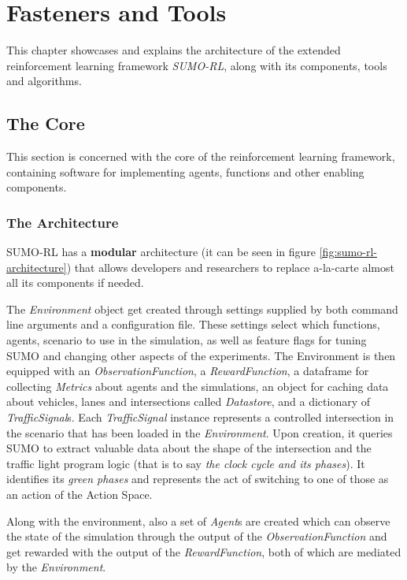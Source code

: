 \chapter{Fasteners and Tools}

This chapter showcases and explains the architecture of the extended reinforcement learning framework \textit{SUMO-RL}, along with its components, tools and algorithms.

\section{The Core}

This section is concerned with the core of the reinforcement learning framework, containing software for implementing agents, functions and other enabling components.

\subsection{The Architecture}

SUMO-RL has a \textbf{modular} architecture (it can be seen in figure \ref{fig:sumo-rl-architecture}) that allows developers and researchers to replace a-la-carte almost all its components if needed.

The \textit{Environment} object get created through settings supplied by both command line arguments and a configuration file.
These settings select which functions, agents, scenario to use in the simulation, as well as feature flags for tuning SUMO and changing other aspects of the experiments.
The Environment is then equipped with an \textit{ObservationFunction}, a \textit{RewardFunction}, a dataframe for collecting \textit{Metrics} about agents and the simulations, an object for caching data about vehicles, lanes and intersections called \textit{Datastore}, and a dictionary of \textit{TrafficSignal}s.
Each \textit{TrafficSignal} instance represents a controlled intersection in the scenario that has been loaded in the \textit{Environment}. Upon creation, it queries SUMO to extract valuable data about the shape of the intersection and the traffic light program logic (that is to say \textit{the clock cycle and its phases}). It identifies its \textit{green phases} and represents the act of switching to one of those as an action of the Action Space.

Along with the environment, also a set of \textit{Agent}s are created which can observe the state of the simulation through the output of the \textit{ObservationFunction} and get rewarded with the output of the \textit{RewardFunction}, both of which are mediated by the \textit{Environment}.

